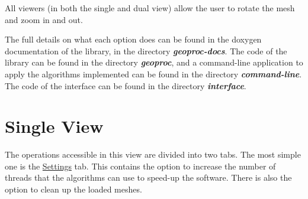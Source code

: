 \documentclass[12pt]{article}
\newcommand \dir[1] {\textbf{\textit{#1}}}
\newcommand \tabbox[1] {\underline{#1}}
\begin{document}
All viewers (in both the single and dual view) allow the user to rotate
the mesh and zoom in and out.

\hfill

The full details on what each option does can be found in the doxygen
documentation of the library, in the directory \dir{geoproc-docs}.
The code of the library can be found in the directory \dir{geoproc},
and a command-line application to apply the algorithms implemented can
be found in the directory \dir{command-line}. The code of the
interface can be found in the directory \dir{interface}.

\section{Single View}
\label{sec:single-view}

The operations accessible in this view are divided into two tabs.
The most simple one is the \tabbox{Settings} tab. This contains the
option to increase the number of threads that the algorithms can use
to speed-up the software. There is also the option to clean up the
loaded meshes.

\hfill
\end{document}

